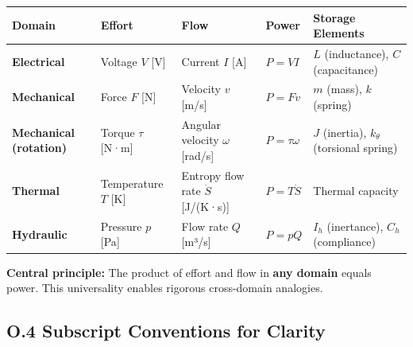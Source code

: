 \documentclass[
]{article}
\begin{document}
\begin{longtable}[]{@{}
  >{\raggedright\arraybackslash}p{}
  >{\raggedright\arraybackslash}p{}
  >{\raggedright\arraybackslash}p{}
  >{\raggedright\arraybackslash}p{}
  >{\raggedright\arraybackslash}p{}@{}}
\toprule\noalign{}
\begin{minipage}[b]{\linewidth}\raggedright
Domain
\end{minipage} & \begin{minipage}[b]{\linewidth}\raggedright
\textbf{Effort}
\end{minipage} & \begin{minipage}[b]{\linewidth}\raggedright
\textbf{Flow}
\end{minipage} & \begin{minipage}[b]{\linewidth}\raggedright
\textbf{Power}
\end{minipage} & \begin{minipage}[b]{\linewidth}\raggedright
\textbf{Storage Elements}
\end{minipage} \\
\midrule\noalign{}
\endhead
\bottomrule\noalign{}
\endlastfoot
\textbf{Electrical} & Voltage \(V\) {[}V{]} & Current \(I\) {[}A{]} &
\(P = VI\) & \(L\) (inductance), \(C\) (capacitance) \\
\textbf{Mechanical} & Force \(F\) {[}N{]} & Velocity \(v\) {[}m/s{]} &
\(P = Fv\) & \(m\) (mass), \(k\) (spring) \\
\textbf{Mechanical (rotation)} & Torque \(\tau\) {[}N·m{]} & Angular
velocity \(\omega\) {[}rad/s{]} & \(P = \tau\omega\) & \(J\) (inertia),
\(k_\theta\) (torsional spring) \\
\textbf{Thermal} & Temperature \(T\) {[}K{]} & Entropy flow rate
\(\dot{S}\) {[}J/(K·s){]} & \(P = T\dot{S}\) & Thermal capacity \\
\textbf{Hydraulic} & Pressure \(p\) {[}Pa{]} & Flow rate \(Q\)
{[}m³/s{]} & \(P = pQ\) & \(I_h\) (inertance), \(C_h\) (compliance) \\
\end{longtable}

\textbf{Central principle:} The product of effort and flow in
\textbf{any domain} equals power. This universality enables rigorous
cross-domain analogies.

\subsection{O.4 Subscript Conventions for
Clarity}\label{o.4-subscript-conventions-for-clarity}
\end{document}

